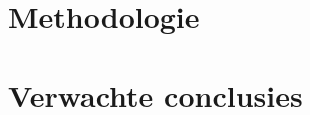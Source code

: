\documentclass{hogent-article}
\begin{document}
\section{Methodologie}


\lipsum[10-12]

\section{Verwachte conclusies}


\lipsum[14-18]


\printbibliography[heading=bibintoc]
\end{document}

